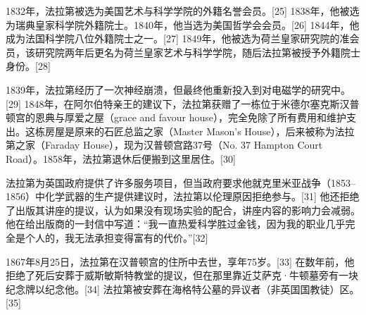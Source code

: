 1832年，法拉第被选为美国艺术与科学学院的外籍名誉会员。[25] 1838年，他被选为瑞典皇家科学院外籍院士。1840年，他当选为美国哲学会会员。[26] 1844年，他成为法国科学院八位外籍院士之一。[27] 1849年，他被选为荷兰皇家研究院的准会员，该研究院两年后更名为荷兰皇家艺术与科学学院，随后法拉第被授予外籍院士身份。[28]

1839年，法拉第经历了一次神经崩溃，但最终他重新投入到对电磁学的研究中。[29] 1848年，在阿尔伯特亲王的建议下，法拉第获赠了一栋位于米德尔塞克斯汉普顿宫的恩典与厚爱之屋（grace and favour house），完全免除了所有费用和维护支出。这栋房屋是原来的石匠总监之家（Master Mason's House），后来被称为法拉第之家（Faraday House），现为汉普顿宫路37号（No. 37 Hampton Court Road）。1858年，法拉第退休后便搬到这里居住。[30]

法拉第为英国政府提供了许多服务项目，但当政府要求他就克里米亚战争（1853–1856）中化学武器的生产提供建议时，法拉第以伦理原因拒绝参与。[31] 他还拒绝了出版其讲座的提议，认为如果没有现场实验的配合，讲座内容的影响力会减弱。他在给出版商的一封信中写道：“我一直热爱科学胜过金钱，因为我的职业几乎完全是个人的，我无法承担变得富有的代价。”[32]

1867年8月25日，法拉第在汉普顿宫的住所中去世，享年75岁。[33] 在数年前，他拒绝了死后安葬于威斯敏斯特教堂的提议，但在那里靠近艾萨克·牛顿墓旁有一块纪念牌以纪念他。[34] 法拉第被安葬在海格特公墓的异议者（非英国国教徒）区。[35]
